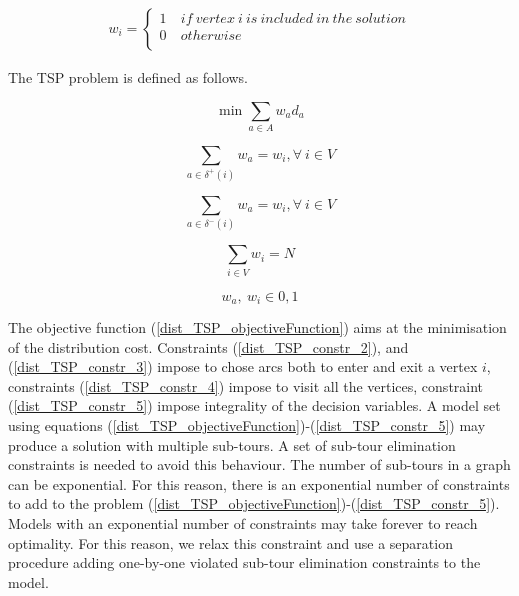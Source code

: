 \begin{equation}
   \begin{split}
   w_i=\left\{
                \begin{array}{ll}
                  1\ & if\ vertex\ i\ is\ included\ in\ the\ solution \\
                  0 & otherwise\\
                \end{array}
              \right.
   \end{split}
\end{equation}

The TSP problem is defined as follows.

\begin{equation}
\min{\sum_{a\in A}{w_ad_a}}
\label{dist_TSP_objectiveFunction}
\end{equation}

\begin{equation}
\sum_{a\in\delta^+(i)}{w_a=w_i, \forall\ i\in V}
\label{dist_TSP_constr_2}
\end{equation}

\begin{equation}
\sum_{a\in\delta^-(i)}{w_a=w_i, \forall\ i\in V}
\label{dist_TSP_constr_3}
\end{equation}

\begin{equation}
\sum_{i\in V}{w_i=N}
\label{dist_TSP_constr_4}
\end{equation}

\begin{equation}
w_a,\ w_i\in{0,1}
\label{dist_TSP_constr_5}
\end{equation}

The objective function (\ref{dist_TSP_objectiveFunction}) aims at the minimisation of the distribution cost. Constraints (\ref{dist_TSP_constr_2}), and (\ref{dist_TSP_constr_3}) impose to chose arcs both to enter and exit a vertex $i$, constraints (\ref{dist_TSP_constr_4}) impose to visit all the vertices, constraint (\ref{dist_TSP_constr_5}) impose integrality of the decision variables. A model set using equations (\ref{dist_TSP_objectiveFunction})-(\ref{dist_TSP_constr_5}) may produce a solution with multiple sub-tours. A set of sub-tour elimination constraints is needed to avoid this behaviour. The number of sub-tours in a graph can be exponential. For this reason, there is an exponential number of constraints to add to the problem (\ref{dist_TSP_objectiveFunction})-(\ref{dist_TSP_constr_5}). Models with an exponential number of constraints may take forever to reach optimality. For this reason, we relax this constraint and use a separation procedure adding one-by-one violated sub-tour elimination constraints to the model.\par

